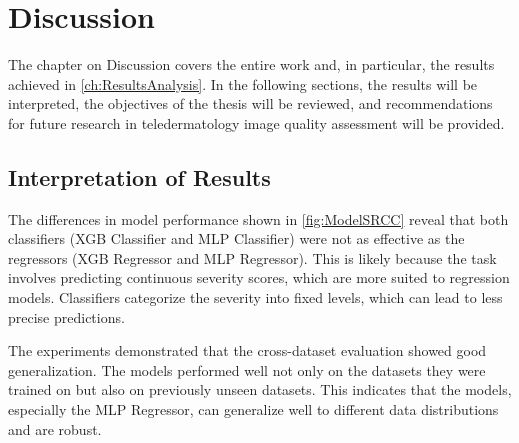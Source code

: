 \chapter{Discussion}
\label{ch:Discussion}
The chapter on Discussion covers the entire work and, in particular, the results achieved in \autoref{ch:ResultsAnalysis}. In the following sections, the results will be interpreted, the objectives of the thesis will be reviewed, and recommendations for future research in teledermatology image quality assessment will be provided. \par
\section{Interpretation of Results}
\label{sec:InterpretationResults}
The differences in model performance shown in \autoref{fig:ModelSRCC} reveal that both classifiers (XGB Classifier and MLP Classifier) were not as effective as the regressors (XGB Regressor and MLP Regressor). This is likely because the task involves predicting continuous severity scores, which are more suited to regression models. Classifiers categorize the severity into fixed levels, which can lead to less precise predictions.\par {}
\vspace{\baselineskip}
\noindent
The experiments demonstrated that the cross-dataset evaluation showed good generalization. The models performed well not only on the datasets they were trained on but also on previously unseen datasets. This indicates that the models, especially the MLP Regressor, can generalize well to different data distributions and are robust.\par
